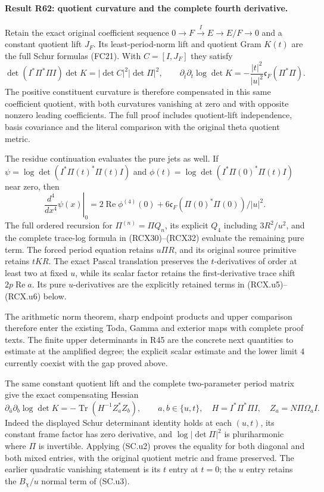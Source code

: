 \paragraph{Result R62: quotient curvature and the complete fourth derivative.}
Retain the exact original coefficient sequence
$0\to F\xrightarrow I E\to E/F\to0$ and a constant quotient lift
$J_F$. Its least-period-norm lift and quotient Gram $K(t)$ are the
full Schur formulas (FC21). With $C=[I,J_F]$ they satisfy
\[
 \det(I^*\Pi^*\Pi I)\det K
      =|\det C|^2|\det\Pi|^2,
 \qquad
 \partial_{\bar t}\partial_t\log\det K
      =-\frac{|t|^2}{|u|^2}\mathfrak c_F(\Pi^*\Pi).
\]
The positive constituent curvature is therefore compensated in this
same coefficient quotient, with both curvatures vanishing at zero
and with opposite nonzero leading coefficients. The full proof
includes quotient-lift independence, basis covariance and the
literal comparison with the original theta quotient metric.

The residue continuation evaluates the pure jets as well. If
$\psi=\log\det(I^*\Pi(t)^*\Pi(t)I)$ and
$\phi(t)=\log\det(I^*\Pi(0)^*\Pi(t)I)$ near zero, then
\[
 \left.\frac{d^4}{dx^4}\psi(x)\right|_0
   =2\operatorname{Re}\phi^{(4)}(0)
       +6\mathfrak c_F(\Pi(0)^*\Pi(0))/|u|^2.
\]
The full ordered recursion for $\Pi^{(n)}=\Pi Q_n$, its explicit
$Q_4$ including $3R^2/u^2$, and the complete trace-log formula in
(RCX30)--(RCX32) evaluate the remaining pure term. The forced
period equation retains $u\Pi R$, and its original source
primitive retains $tKR$. The exact Pascal translation preserves the \(t\)-derivatives
of order at least two at fixed \(u\), while its scalar factor
retains the first-derivative trace shift
\(2p\operatorname{Re}a\).  Its pure \(u\)-derivatives are
the explicitly retained terms in (RCX.u5)--(RCX.u6) below.


The arithmetic norm theorem, sharp endpoint products and upper
comparison therefore enter the existing Toda, Gamma and exterior
maps with complete proof texts. The finite upper determinants in
R45 are the concrete next quantities to estimate at the amplified
degree; the explicit scalar estimate and the lower limit $4$
currently coexist with the gap proved above.

The same constant quotient lift and the complete two-parameter
period matrix give the exact compensating Hessian
\[
 \partial_{\bar a}\partial_b\log\det K
    =-\operatorname{Tr}(H^{-1}Z_a^*Z_b),\qquad
 a,b\in\{u,t\},\quad
 H=I^*\Pi^*\Pi I,\quad
 Z_a=N\Pi\Omega_a I .
\]
Indeed the displayed Schur determinant identity holds at
each \((u,t)\), its constant frame factor has zero
derivative, and \(\log|\det\Pi|^2\) is pluriharmonic
where \(\Pi\) is invertible.  Applying (SC.u2) proves
the equality for both diagonal and both mixed entries,
with the original quotient metric and frame preserved.
The earlier quadratic vanishing statement is its \(t\)
entry at \(t=0\); the \(u\) entry retains the
\(B_\chi/u\) normal term of (SC.u3).

